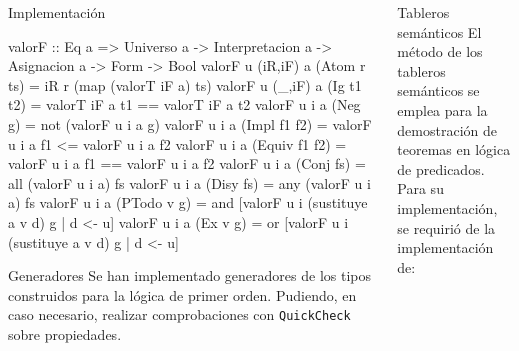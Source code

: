 \documentclass[final]{beamer}
\newlength{\onecolwid}
\newlength{\twocolwid}
\begin{document}
\begin{frame}[t,fragile]
\begin{columns}[t]
\begin{column}{\twocolwid} %

\begin{columns}[t,totalwidth=\twocolwid] %

\begin{column}{\onecolwid}\vspace{-.6in} %

  \begin{block}{Implementación}
    \begin{code}
valorF :: Eq a => Universo a -> Interpretacion a
             -> Asignacion a -> Form -> Bool
valorF u (iR,iF) a (Atom r ts) =
  iR r (map (valorT iF a) ts)
valorF u (_,iF) a (Ig t1 t2) = 
  valorT iF a t1 == valorT iF a t2
valorF u i a (Neg g) =
  not (valorF u i a g)
valorF u i a (Impl f1 f2) =
  valorF u i a f1 <= valorF u i a f2
valorF u i a (Equiv f1 f2) =
  valorF u i a f1 == valorF u i a f2
valorF u i a (Conj fs) =
  all (valorF u i a) fs
valorF u i a (Disy fs) =
  any (valorF u i a) fs
valorF u i a (PTodo v g) = 
  and [valorF u i (sustituye a v d) g | d <- u]
valorF u i a (Ex v g)  =
  or  [valorF u i (sustituye a v d) g | d <- u]
    \end{code}
  
  \end{block}

  \begin{block}{Generadores}
    Se han implementado generadores de los tipos construidos para la lógica de primer orden.
    Pudiendo, en caso necesario, realizar comprobaciones con \texttt{QuickCheck} sobre
    propiedades.
  \end{block}


\end{column} %

\begin{column}{\onecolwid}\vspace{-.6in} %


  \begin{block}{Tableros semánticos}
    El método de los tableros semánticos se emplea para la demostración de teoremas en
    lógica de predicados. Para su implementación, se requirió de la implementación de:


\end{block}
\end{column}
\end{columns}
\end{column}
\end{columns}
\end{frame}
\end{document}

